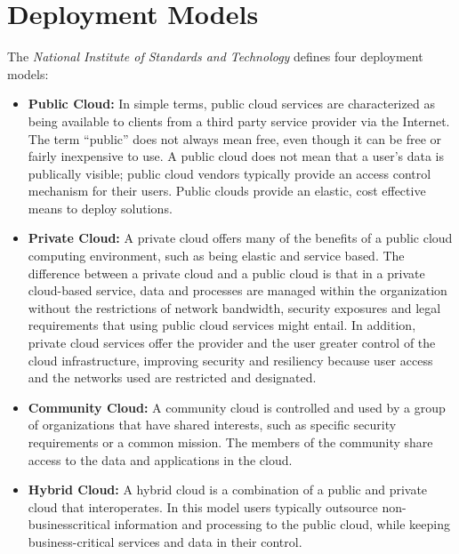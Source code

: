 \section{Deployment Models}
The \emph{National Institute of Standards and Technology} defines four deployment models:
\begin{itemize}
  \item {\bf Public Cloud:} In simple terms, public cloud services are characterized as being available to clients from a third party 
        service provider via the Internet. The term “public” does not always mean free, even though it can be free or fairly inexpensive 
        to use. A public cloud does not mean that a user’s data is publically visible; public cloud vendors typically provide an access 
        control mechanism for their users. Public clouds provide an elastic, cost effective means to deploy solutions.
  \item {\bf Private Cloud:} A private cloud offers many of the benefits of a public cloud computing environment, such as being elastic 
        and service based. The difference between a private cloud and a public cloud is that in a private cloud-based service, data and
        processes are managed within the organization without the restrictions of network bandwidth, security exposures and legal 
        requirements that using public cloud services might entail. In addition, private cloud services offer the provider and the user 
        greater control of the cloud infrastructure, improving security and resiliency because user access and the networks used are 
        restricted and designated.
  \item {\bf Community Cloud:} A community cloud is controlled and used by a group of organizations that have shared interests, such 
        as specific security requirements or a common mission. The members of the community share access to the data and applications 
        in the cloud.
  \item {\bf Hybrid Cloud:} A hybrid cloud is a combination of a public and private cloud that interoperates. In this model users 
        typically outsource non-businesscritical information and processing to the public cloud, while keeping business-critical 
        services and data in their control.
\end{itemize}
